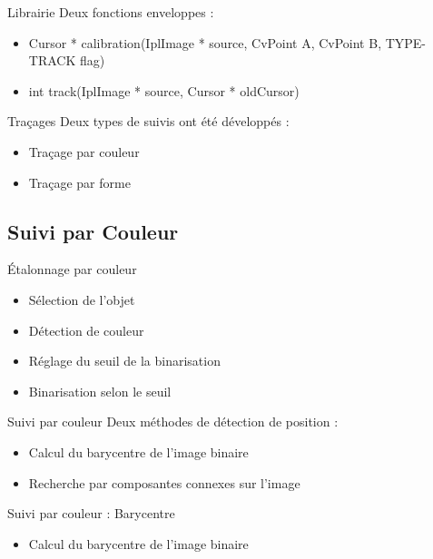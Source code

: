 \documentclass{beamer}
\begin{document}
		\begin{frame}{Librairie}
		Deux fonctions enveloppes : \\
			\begin{itemize}
				\item{Cursor * calibration(IplImage * source, CvPoint A, CvPoint B, TYPE-TRACK flag)}
				\item{int track(IplImage * source, Cursor * oldCursor)}
			\end{itemize}		
		\end{frame}

		\begin{frame}{Traçages}
		Deux types de suivis ont été développés : \\
			\begin{itemize}
				\item{Traçage par couleur}
				\item{Traçage par forme}
			\end{itemize}
		\end{frame}

		\subsection{Suivi par Couleur}
		\begin{frame}{Étalonnage par couleur}
			\begin{itemize}
				\item{Sélection de l'objet}
				\item{Détection de couleur}
				\item{Réglage du seuil de la binarisation}
				\item{Binarisation selon le seuil}
			\end{itemize}
		\end{frame}

		\begin{frame}{Suivi par couleur}
			Deux méthodes de détection de position :
			\begin{itemize}
				\item{Calcul du barycentre de l'image binaire}
				\item{Recherche par composantes connexes sur l'image}
			\end{itemize}
		\end{frame}

		\begin{frame}{Suivi par couleur : Barycentre}
			\begin{itemize}
				\item{Calcul du barycentre de l'image binaire}
			\end{itemize}
		\end{frame}
\end{document}
